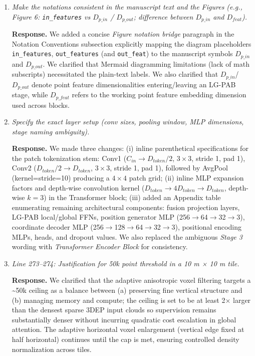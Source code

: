 \documentclass[11pt]{article}
\newcommand{\response}{\textbf{Response.} }
\begin{document}
\begin{enumerate}

  \item \emph{Make the notations consistent in the manuscript text and the Figures (e.g., Figure 6: \texttt{in\_features} vs $D_{p\_in}$ / $D_{p\_out}$; difference between $D_{p\_in}$ and $D_{feat}$).}

  \response We added a concise \emph{Figure notation bridge} paragraph in the Notation Conventions subsection explicitly mapping the diagram placeholders \texttt{in\_features}, \texttt{out\_features} (and \texttt{out\_feat}) to the manuscript symbols $D_{p\_in}$ and $D_{p\_out}$. We clarified that Mermaid diagramming limitations (lack of math subscripts) necessitated the plain-text labels. We also clarified that $D_{p\_in}$/$D_{p\_out}$ denote point feature dimensionalities entering/leaving an LG-PAB stage, while $D_{p\_feat}$ refers to the working point feature embedding dimension used across blocks.

  \item \emph{Specify the exact layer setup (conv sizes, pooling window, MLP dimensions, stage naming ambiguity).}

  \response We made three changes: (i) inline parenthetical specifications for the patch tokenization stem: Conv1 ($C_{in}\rightarrow D_{token}/2$, $3\times3$, stride 1, pad 1), Conv2 ($D_{token}/2\rightarrow D_{token}$, $3\times3$, stride 1, pad 1), followed by AvgPool (kernel=stride=10) producing a $4\times4$ patch grid; (ii) inline MLP expansion factors and depth-wise convolution kernel ($D_{token}\rightarrow 4D_{token} \rightarrow D_{token}$, depth-wise $k=3$) in the Transformer block; (iii) added an Appendix table enumerating remaining architectural components: fusion projection layers, LG-PAB local/global FFNs, position generator MLP (256$\rightarrow$64$\rightarrow$32$\rightarrow$3), coordinate decoder MLP (256$\rightarrow$128$\rightarrow$64$\rightarrow$32$\rightarrow$3), positional encoding MLPs, heads, and dropout values. We also replaced the ambiguous \emph{Stage 3} wording with \emph{Transformer Encoder Block} for consistency.

  \item \emph{Line 273–274: Justification for 50k point threshold in a 10 m × 10 m tile.}

  \response We clarified that the adaptive anisotropic voxel filtering targets a \textasciitilde50k ceiling as a balance between (a) preserving fine vertical structure and (b) managing memory and compute; the ceiling is set to be at least 2× larger than the densest sparse 3DEP input clouds so supervision remains substantially denser without incurring quadratic cost escalation in global attention. The adaptive horizontal voxel enlargement (vertical edge fixed at half horizontal) continues until the cap is met, ensuring controlled density normalization across tiles.


\end{enumerate}
\end{document}

